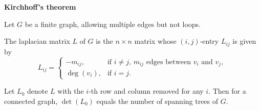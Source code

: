 \textbf{Kirchhoff's theorem}

Let $G$ be a finite graph, allowing multiple edges but not loops.

The laplacian matrix $L$ of $G$ is the $n \times n$ matrix whose
$(i, j)$-entry $L_{i j}$ is given by
\begin{displaymath}
L_{i j} = \left\{ \begin{array}{ll}
-m_{i j}, & \textrm{if $i \ne j$, $m_{i j}$ edges between $v_i$ and $v_j$, } \\
\deg(v_i), & \textrm{if $i = j$.}
\end{array} \right.
\end{displaymath}

Let $L_0$ denote $L$ with the $i$-th row and column removed for any $i$.
Then for a connected graph, $\det(L_0)$ equals the number of spanning trees of $G$.
